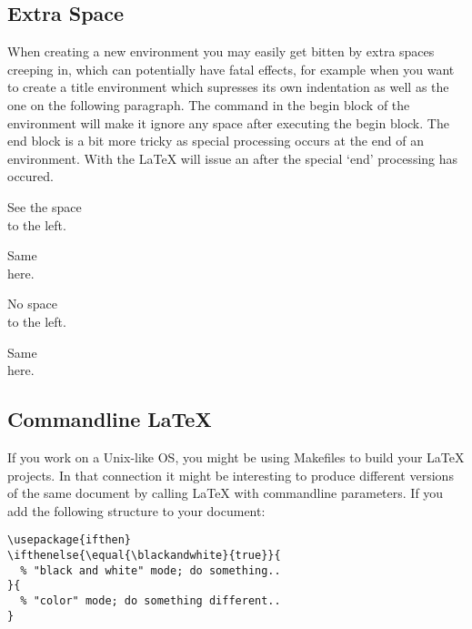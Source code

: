 \subsection{Extra Space}

When creating a new environment you may easily get bitten by extra spaces
creeping in, which can potentially have fatal effects, for example when you
want to create a title environment which supresses its own indentation as
well as the one on the following paragraph. The  command in
the begin block of the environment will make it ignore any space after
executing the begin block. The end block is a bit more tricky as special
processing occurs at the end of an environment. With the
 \LaTeX{} will issue an  after the
special `end' processing has occured.

\begin{example}
\newenvironment{simple}%
 {\noindent}%
 {\par\noindent}

\begin{simple}
See the space\\to the left.
\end{simple}
Same\\here.
\end{example}

\begin{example}
\newenvironment{correct}%
 {\noindent\ignorespaces}%
 {\par\noindent%
   \ignorespacesafterend}

\begin{correct}
No space\\to the left.
\end{correct}
Same\\here.
\end{example}

\subsection{Commandline \LaTeX}

If you work on a Unix-like OS, you might be using Makefiles to build your
\LaTeX{} projects. In that connection it might be interesting to produce
different versions of the same document by calling \LaTeX{} with commandline
parameters. If you add the following structure to your document:

\begin{verbatim}
\usepackage{ifthen}
\ifthenelse{\equal{\blackandwhite}{true}}{
  % "black and white" mode; do something..
}{
  % "color" mode; do something different..
}
\end{verbatim}

